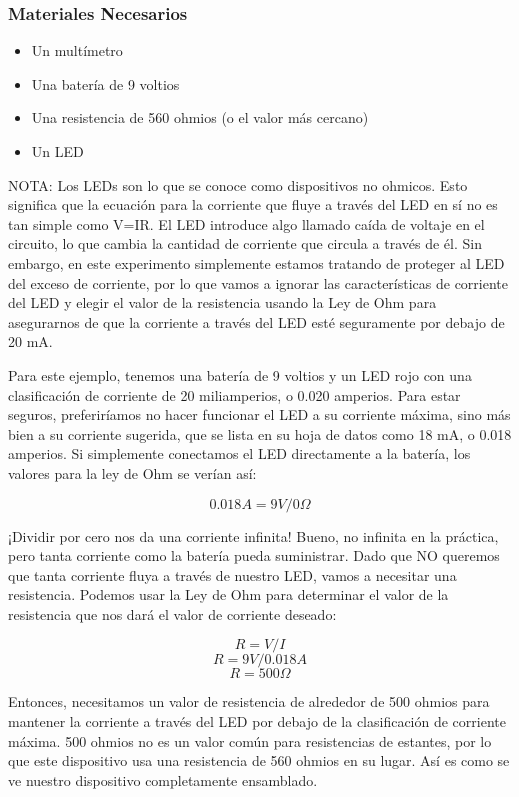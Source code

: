 \documentclass[output=paper, 
colorlinks,
citecolor=brown,
newtxmath
]{langscibook}
\begin{document}
\subsubsection{Materiales Necesarios}

\begin{itemize}
  \setlength\itemsep{-0.5em}
\item Un multímetro
\item Una batería de 9 voltios
\item Una resistencia de 560 ohmios (o el valor más cercano)
\item Un LED
\end{itemize}

NOTA: Los LEDs son lo que se conoce como dispositivos no ohmicos. Esto significa que la ecuación para la corriente que fluye a través del LED en sí no es tan simple como V=IR. El LED introduce algo llamado caída de voltaje en el circuito, lo que cambia la cantidad de corriente que circula a través de él. Sin embargo, en este experimento simplemente estamos tratando de proteger al LED del exceso de corriente, por lo que vamos a ignorar las características de corriente del LED y elegir el valor de la resistencia usando la Ley de Ohm para asegurarnos de que la corriente a través del LED esté seguramente por debajo de 20 mA.

Para este ejemplo, tenemos una batería de 9 voltios y un LED rojo con una clasificación de corriente de 20 miliamperios, o 0.020 amperios. Para estar seguros, preferiríamos no hacer funcionar el LED a su corriente máxima, sino más bien a su corriente sugerida, que se lista en su hoja de datos como 18 mA, o 0.018 amperios. Si simplemente conectamos el LED directamente a la batería, los valores para la ley de Ohm se verían así:

\[0.018A = 9V / 0Ω\]

¡Dividir por cero nos da una corriente infinita! Bueno, no infinita en la práctica, pero tanta corriente como la batería pueda suministrar. Dado que NO queremos que tanta corriente fluya a través de nuestro LED, vamos a necesitar una resistencia.  Podemos usar la Ley de Ohm para determinar el valor de la resistencia que nos dará el valor de corriente deseado:

\[R = V / I\]
\[R = 9V / 0.018A\]
\[R = 500Ω\]

Entonces, necesitamos un valor de resistencia de alrededor de 500 ohmios para mantener la corriente a través del LED por debajo de la clasificación de corriente máxima. 500 ohmios no es un valor común para resistencias de estantes, por lo que este dispositivo usa una resistencia de 560 ohmios en su lugar. Así es como se ve nuestro dispositivo completamente ensamblado.
\end{document}
